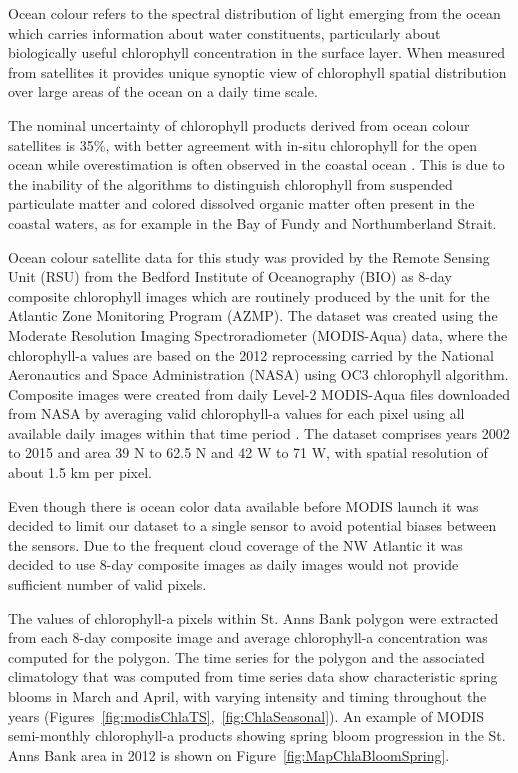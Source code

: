 \documentclass[letterpaper,portrait,11pt]{scrartcl}
\numberwithin{equation}{section}    %
\numberwithin{figure}{section}    %
\numberwithin{table}{section}       %
\begin{document}
Ocean colour refers to the spectral distribution of light emerging from the ocean which carries information about water constituents, particularly about biologically useful chlorophyll concentration in the surface layer. When measured from satellites it provides unique synoptic view of chlorophyll spatial distribution over large areas of the ocean on a daily time scale.

The nominal uncertainty of chlorophyll products derived from ocean colour satellites is 35\%, with better agreement with in-situ chlorophyll for the open ocean \parencite{moore2008impacts} while overestimation is often observed in the coastal ocean \parencite{darecki2004evaluation}. This is due to the inability of the algorithms to distinguish chlorophyll from suspended particulate matter and colored dissolved organic matter often present in the coastal waters, as for example in the Bay of Fundy and Northumberland Strait.

Ocean colour satellite data for this study was provided by the Remote Sensing Unit (RSU) from the Bedford Institute of Oceanography (BIO) as 8-day composite chlorophyll images which are routinely produced by the unit for the Atlantic Zone Monitoring Program (AZMP). The dataset was created using the Moderate Resolution Imaging Spectroradiometer (MODIS-Aqua) data, where the chlorophyll-a values are based on the 2012 reprocessing carried by the National Aeronautics and Space Administration (NASA) using OC3 chlorophyll algorithm. Composite images were created from daily Level-2 MODIS-Aqua files downloaded from NASA by averaging valid chlorophyll-a values for each pixel using all available daily images within that time period \parencite{Caverhill:2015:modis,feldman:2015}. The dataset comprises years 2002 to 2015 and area 39 N to 62.5 N and 42 W to 71 W, with spatial resolution of about 1.5 km per pixel. 

Even though there is ocean color data available before MODIS launch it was decided to limit our dataset to a single sensor to avoid potential biases between the sensors. Due to the frequent cloud coverage of the NW Atlantic it was decided to use 8-day composite images as daily images would not provide sufficient number of valid pixels. 

The values of chlorophyll-a pixels within St. Anns Bank polygon were extracted from each 8-day composite image and average chlorophyll-a concentration was computed for the polygon. The time series for the polygon and the associated climatology that was computed from time series data show characteristic spring blooms in March and April, with varying intensity and timing throughout the years (Figures~\ref{fig:modisChlaTS},~\ref{fig:ChlaSeasonal}). An example of MODIS semi-monthly chlorophyll-a products showing spring bloom progression in the St. Anns Bank area in 2012 is shown on Figure~\ref{fig:MapChlaBloomSpring}.
\end{document}
